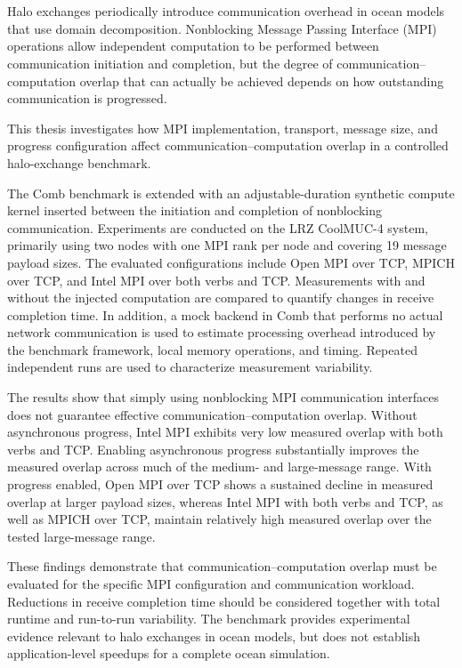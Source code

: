 \chapter{\abstractname}

Halo exchanges periodically introduce communication overhead in ocean models that use domain decomposition. Nonblocking Message Passing Interface (MPI) operations allow independent computation to be performed between communication initiation and completion, but the degree of communication--computation overlap that can actually be achieved depends on how outstanding communication is progressed.

This thesis investigates how MPI implementation, transport, message size, and progress configuration affect communication--computation overlap in a controlled halo-exchange benchmark.

The Comb benchmark is extended with an adjustable-duration synthetic compute kernel inserted between the initiation and completion of nonblocking communication. Experiments are conducted on the LRZ CoolMUC-4 system, primarily using two nodes with one MPI rank per node and covering 19 message payload sizes. The evaluated configurations include Open MPI over TCP, MPICH over TCP, and Intel MPI over both verbs and TCP. Measurements with and without the injected computation are compared to quantify changes in receive completion time. In addition, a mock backend in Comb that performs no actual network communication is used to estimate processing overhead introduced by the benchmark framework, local memory operations, and timing. Repeated independent runs are used to characterize measurement variability.

The results show that simply using nonblocking MPI communication interfaces does not guarantee effective communication--computation overlap. Without asynchronous progress, Intel MPI exhibits very low measured overlap with both verbs and TCP. Enabling asynchronous progress substantially improves the measured overlap across much of the medium- and large-message range. With progress enabled, Open MPI over TCP shows a sustained decline in measured overlap at larger payload sizes, whereas Intel MPI with both verbs and TCP, as well as MPICH over TCP, maintain relatively high measured overlap over the tested large-message range.

These findings demonstrate that communication--computation overlap must be evaluated for the specific MPI configuration and communication workload. Reductions in receive completion time should be considered together with total runtime and run-to-run variability. The benchmark provides experimental evidence relevant to halo exchanges in ocean models, but does not establish application-level speedups for a complete ocean simulation.
